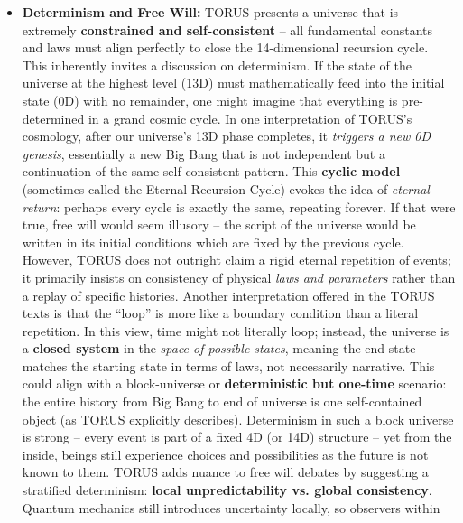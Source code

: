 \documentclass[
]{article}
\begin{document}
{\begin{itemize}
\item
  \textbf{Determinism and Free Will:} TORUS presents a universe that is
  extremely \textbf{constrained and self-consistent} -- all fundamental
  constants and laws must align perfectly to close the 14-dimensional
  recursion cycle\hspace{0pt}. This inherently invites a discussion on
  determinism. If the state of the universe at the highest level (13D)
  must mathematically feed into the initial state (0D) with no
  remainder, one might imagine that everything is pre-determined in a
  grand cosmic cycle. In one interpretation of TORUS's cosmology, after
  our universe's 13D phase completes, it \emph{triggers a new 0D
  genesis}, essentially a new Big Bang that is not independent but a
  continuation of the same self-consistent pattern\hspace{0pt}. This
  \textbf{cyclic model} (sometimes called the Eternal Recursion Cycle)
  evokes the idea of \emph{eternal return}: perhaps every cycle is
  exactly the same, repeating forever. If that were true, free will
  would seem illusory -- the script of the universe would be written in
  its initial conditions which are fixed by the previous cycle. However,
  TORUS does not outright claim a rigid eternal repetition of events; it
  primarily insists on consistency of physical \emph{laws and
  parameters} rather than a replay of specific histories. Another
  interpretation offered in the TORUS texts is that the ``loop'' is more
  like a boundary condition than a literal repetition\hspace{0pt}. In
  this view, time might not literally loop; instead, the universe is a
  \textbf{closed system} in the \emph{space of possible states}, meaning
  the end state matches the starting state in terms of laws, not
  necessarily narrative. This could align with a block-universe or
  \textbf{deterministic but one-time} scenario: the entire history from
  Big Bang to end of universe is one self-contained object (as TORUS
  explicitly describes)\hspace{0pt}. Determinism in such a block
  universe is strong -- every event is part of a fixed 4D (or 14D)
  structure -- yet from the inside, beings still experience choices and
  possibilities as the future is not known to them. TORUS adds nuance to
  free will debates by suggesting a stratified determinism:
  \textbf{local unpredictability vs. global consistency}. Quantum
  mechanics still introduces uncertainty locally, so observers within

\end{itemize}}
\end{document}
